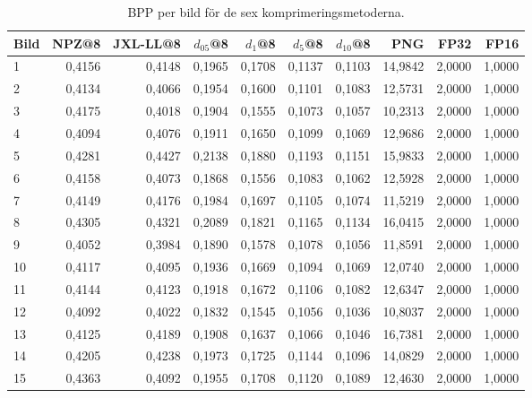 \begin{table}[H]
\centering
\caption{BPP per bild för de sex komprimeringsmetoderna.}
\label{tab:bpp_per_image}
{\footnotesize
\begin{tabular}{lrrrrrrrrr}
\hline
\textbf{Bild} & \textbf{NPZ@8} & \textbf{JXL-LL@8} & \boldmath$d_{05}$@8 & \boldmath$d_1$@8 & \boldmath$d_5$@8 & \boldmath$d_{10}$@8 & \textbf{PNG} & \textbf{FP32} & \textbf{FP16} \\
\hline
 1 & 0{,}4156 & 0{,}4148 & 0{,}1965 & 0{,}1708 & 0{,}1137 & 0{,}1103 & 14{,}9842 & 2{,}0000 & 1{,}0000 \\
 2 & 0{,}4134 & 0{,}4066 & 0{,}1954 & 0{,}1600 & 0{,}1101 & 0{,}1083 & 12{,}5731 & 2{,}0000 & 1{,}0000 \\
 3 & 0{,}4175 & 0{,}4018 & 0{,}1904 & 0{,}1555 & 0{,}1073 & 0{,}1057 & 10{,}2313 & 2{,}0000 & 1{,}0000 \\
 4 & 0{,}4094 & 0{,}4076 & 0{,}1911 & 0{,}1650 & 0{,}1099 & 0{,}1069 & 12{,}9686 & 2{,}0000 & 1{,}0000 \\
 5 & 0{,}4281 & 0{,}4427 & 0{,}2138 & 0{,}1880 & 0{,}1193 & 0{,}1151 & 15{,}9833 & 2{,}0000 & 1{,}0000 \\
 6 & 0{,}4158 & 0{,}4073 & 0{,}1868 & 0{,}1556 & 0{,}1083 & 0{,}1062 & 12{,}5928 & 2{,}0000 & 1{,}0000 \\
 7 & 0{,}4149 & 0{,}4176 & 0{,}1984 & 0{,}1697 & 0{,}1105 & 0{,}1074 & 11{,}5219 & 2{,}0000 & 1{,}0000 \\
 8 & 0{,}4305 & 0{,}4321 & 0{,}2089 & 0{,}1821 & 0{,}1165 & 0{,}1134 & 16{,}0415 & 2{,}0000 & 1{,}0000 \\
 9 & 0{,}4052 & 0{,}3984 & 0{,}1890 & 0{,}1578 & 0{,}1078 & 0{,}1056 & 11{,}8591 & 2{,}0000 & 1{,}0000 \\
10 & 0{,}4117 & 0{,}4095 & 0{,}1936 & 0{,}1669 & 0{,}1094 & 0{,}1069 & 12{,}0740 & 2{,}0000 & 1{,}0000 \\
11 & 0{,}4144 & 0{,}4123 & 0{,}1918 & 0{,}1672 & 0{,}1106 & 0{,}1082 & 12{,}6347 & 2{,}0000 & 1{,}0000 \\
12 & 0{,}4092 & 0{,}4022 & 0{,}1832 & 0{,}1545 & 0{,}1056 & 0{,}1036 & 10{,}8037 & 2{,}0000 & 1{,}0000 \\
13 & 0{,}4125 & 0{,}4189 & 0{,}1908 & 0{,}1637 & 0{,}1066 & 0{,}1046 & 16{,}7381 & 2{,}0000 & 1{,}0000 \\
14 & 0{,}4205 & 0{,}4238 & 0{,}1973 & 0{,}1725 & 0{,}1144 & 0{,}1096 & 14{,}0829 & 2{,}0000 & 1{,}0000 \\
15 & 0{,}4363 & 0{,}4092 & 0{,}1955 & 0{,}1708 & 0{,}1120 & 0{,}1089 & 12{,}4630 & 2{,}0000 & 1{,}0000 \\

\end{tabular}}
\end{table}
